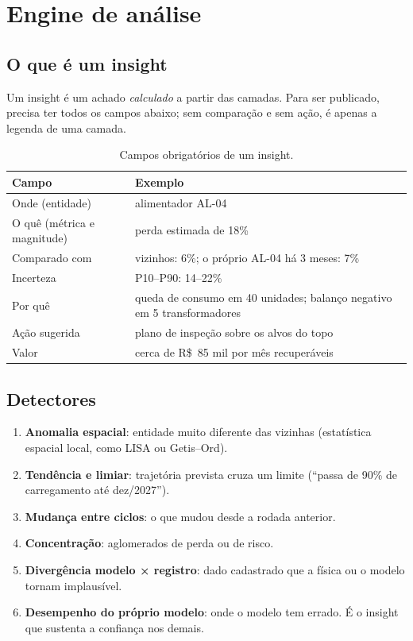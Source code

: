 \documentclass[11pt,a4paper]{article}
\begin{document}
\section{Engine de análise}
\label{sec:engine}

\subsection{O que é um insight}

Um insight é um achado \emph{calculado} a partir das camadas. Para ser
publicado, precisa ter todos os campos abaixo; sem comparação e sem ação, é
apenas a legenda de uma camada.

\begin{table}[H]
\centering
\begin{tabularx}{\textwidth}{l L}
\toprule
\textbf{Campo} & \textbf{Exemplo} \\
\midrule
Onde (entidade) & alimentador AL-04 \\
O quê (métrica e magnitude) & perda estimada de 18\% \\
Comparado com & vizinhos: 6\%; o próprio AL-04 há 3 meses: 7\% \\
Incerteza & P10--P90: 14--22\% \\
Por quê & queda de consumo em 40 unidades; balanço negativo em 5
  transformadores \\
Ação sugerida & plano de inspeção sobre os alvos do topo \\
Valor & cerca de R\$~85 mil por mês recuperáveis \\
\bottomrule
\end{tabularx}
\caption{Campos obrigatórios de um insight.}
\end{table}

\subsection{Detectores}

\begin{enumerate}
  \item \textbf{Anomalia espacial}: entidade muito diferente das vizinhas
    (estatística espacial local, como LISA ou Getis--Ord).
  \item \textbf{Tendência e limiar}: trajetória prevista cruza um limite
    (``passa de 90\% de carregamento até dez/2027'').
  \item \textbf{Mudança entre ciclos}: o que mudou desde a rodada anterior.
  \item \textbf{Concentração}: aglomerados de perda ou de risco.
  \item \textbf{Divergência modelo × registro}: dado cadastrado que a física
    ou o modelo tornam implausível.
  \item \textbf{Desempenho do próprio modelo}: onde o modelo tem errado. É o
    insight que sustenta a confiança nos demais.
\end{enumerate}
\end{document}
